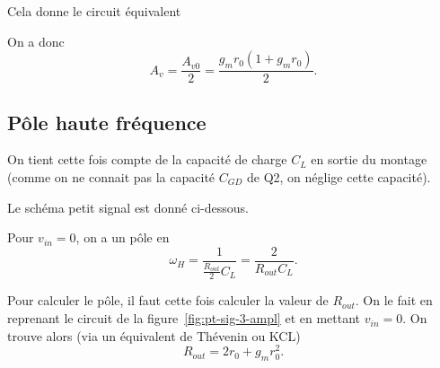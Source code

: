 \documentclass[frenchb,DIV=14]{scrartcl}
\begin{document}
Cela donne le circuit équivalent
\begin{center}
\end{center}

On a donc \[A_v = \frac{A_{v0}}{2} = \frac{g_mr_0(1+g_mr_0)}{2}.\]

\subsection*{Pôle haute fréquence}
On tient cette fois compte de la capacité de charge $C_L$ en sortie du montage
(comme on ne connait pas la capacité $C_{GD}$ de Q2, on néglige cette capacité).

Le schéma petit signal est donné ci-dessous.
\begin{center}
\end{center}

Pour $v_{in} = 0$, on a un pôle en
\[\omega_H = \frac{1}{\frac{R_{out}}{2}C_L} = \frac{2}{R_{out}C_L}.\]

Pour calculer le pôle, il faut cette fois calculer la valeur de $R_{out}$.
On le fait en reprenant le circuit de la figure~\ref{fig:pt-sig-3-ampl} et
en mettant $v_{in} = 0$. On trouve alors (via un équivalent de Thévenin
ou KCL)
\[R_{out} = 2r_0 + g_m r_0^2.\]
\end{document}
